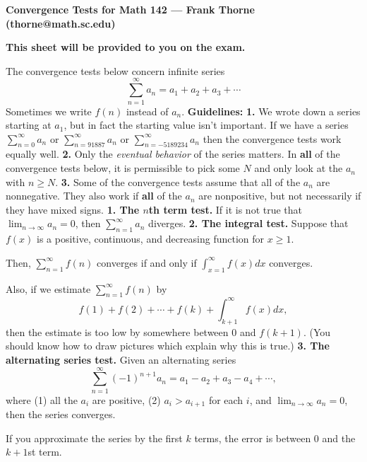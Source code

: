 \documentclass[12pt]{article}
\begin{document}
\setlength{\topmargin}{-2mm}





\begin{center}{\bf Convergence Tests for Math 142 --- Frank Thorne (thorne@math.sc.edu)}
\end{center}
\begin{center}
{\bf This sheet will be provided to you on the exam.}
\end{center}
\vskip 10pt
\vskip 10pt
The convergence tests below concern infinite series
\[
\sum_{n = 1}^{\infty} a_n = a_1 + a_2 + a_3 + \cdots
\]
Sometimes we write $f(n)$ instead of $a_n$.
\vskip 10pt
{\bf Guidelines:}
{\bf 1.} We wrote down a series starting at $a_1$, but in fact the starting
value isn't important. If we have a series $\sum_{n = 0}^{\infty} a_n$
or $\sum_{n = 91887}^{\infty} a_n$ or $\sum_{n = -5189234}^{\infty} a_n$ then
the convergence tests work equally well.
\vskip 10pt
{\bf 2.} Only the {\itshape eventual behavior} of the series matters. In {\bf all}
of the convergence tests below, it is permissible to pick some $N$ and only
look at the $a_n$ with $n \geq N$.
\vskip 10pt
{\bf 3.} Some of the convergence tests assume that all of the $a_n$ are
nonnegative. They also work if {\bf all} of the $a_n$ are nonpositive, but not
necessarily if they have mixed signs.
\vskip 20pt
{\bf 1. The $n$th term test.} If it is not true that $\lim_{n \rightarrow \infty} a_n = 0$, then
$\sum_{n = 1}^{\infty} a_n$ diverges.
\vskip 10pt
{\bf 2. The integral test.} Suppose that $f(x)$ is a positive, continuous, and decreasing function
for $x \geq 1$.

Then, $\sum_{n = 1}^{\infty} f(n)$ converges if and only if $\int_{x = 1}^{\infty} f(x) dx$ converges.

Also, if we estimate $\sum_{n = 1}^{\infty} f(n)$ by
\[
f(1) + f(2) + \cdots + f(k) + \int_{k + 1}^{\infty} f(x) dx,
\]
then the estimate is too low by somewhere between $0$ and $f(k + 1)$. (You should know how to draw pictures
which explain why this is true.)
\vskip 10pt
{\bf 3. The alternating series test.} Given an alternating series
\[
\sum_{n = 1}^{\infty} (-1)^{n + 1} a_n = a_1 - a_2 + a_3 - a_4 + \cdots,
\]
where (1) all the $a_i$ are positive, (2) $a_i > a_{i + 1}$ for each $i$, and $\lim_{n \rightarrow \infty} a_n = 0$,
then the series converges.

If you approximate the series by the first $k$ terms, the error is between $0$ and the $k + 1$st term.
\end{document}
